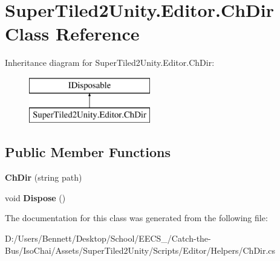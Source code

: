\hypertarget{class_super_tiled2_unity_1_1_editor_1_1_ch_dir}{}\section{Super\+Tiled2\+Unity.\+Editor.\+Ch\+Dir Class Reference}
\label{class_super_tiled2_unity_1_1_editor_1_1_ch_dir}
Inheritance diagram for Super\+Tiled2\+Unity.\+Editor.\+Ch\+Dir\+:\begin{figure}[H]
\begin{center}
\leavevmode
\includegraphics[height=2.000000cm]{class_super_tiled2_unity_1_1_editor_1_1_ch_dir}
\end{center}
\end{figure}
\subsection*{Public Member Functions}
\begin{DoxyCompactItemize}
\item 
\mbox{\label{class_super_tiled2_unity_1_1_editor_1_1_ch_dir_a9aa987b1671e03780bb7d1e69235e1e4}} 
{\bfseries Ch\+Dir} (string path)
\item 
\mbox{\label{class_super_tiled2_unity_1_1_editor_1_1_ch_dir_a652441a1b2f8ef16d5c580c6d8755034}} 
void {\bfseries Dispose} ()
\end{DoxyCompactItemize}


The documentation for this class was generated from the following file\+:\begin{DoxyCompactItemize}
\item 
D\+:/\+Users/\+Bennett/\+Desktop/\+School/\+E\+E\+C\+S\+\_/\+Catch-\/the-\/\+Bus/\+Iso\+Chai/\+Assets/\+Super\+Tiled2\+Unity/\+Scripts/\+Editor/\+Helpers/Ch\+Dir.\+cs\end{DoxyCompactItemize}
